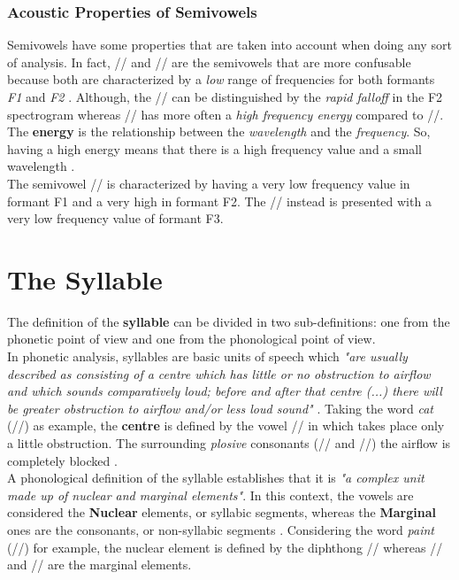 
\subsubsection{Acoustic Properties of Semivowels}
\label{ssub:Acousitc Properties of Semivowels}
Semivowels have some properties that are taken into account when doing any sort of analysis. In fact, // and // are the semivowels that are more confusable because both are characterized by a \textit{low} range of frequencies for both formants \textit{F1} and \textit{F2} \cite{jamesglassvictorzue2003}\cite{olive1993acoustics}. Although, the // can be distinguished by the \textit{rapid falloff} in the F2 spectrogram whereas // has more often a \textit{high frequency energy} compared to //. The \textbf{energy} is the relationship between the \textit{wavelength} and the \textit{frequency}. So, having a high energy means that there is a high frequency value and a small wavelength \cite{energy_relationship}. \\
\noindent The semivowel // is characterized by having a very low frequency value in formant F1 and a very high in formant F2. The // instead is presented with a very low frequency value of formant F3.


\section{The Syllable}
\label{sec:The syllable}
The definition of the \textbf{syllable} can be divided in two sub-definitions: one from the phonetic point of view and one from the phonological point of view. \\
\noindent In phonetic analysis, syllables are basic units of speech  which \textit{"are usually described as consisting of a centre which has little or no obstruction to airflow and which sounds comparatively loud; before and after that centre (...) there will be greater obstruction to airflow and/or less loud sound"} \cite{roach2000phonology}. Taking the word \textit{cat} (//) as example, the \textbf{centre} is defined by the vowel /\textipa{\ae}/ in which takes place only a little obstruction. The surrounding \textit{plosive} consonants (// and //) the airflow is completely blocked \cite{syllable_site}. \\
\noindent A phonological definition of the syllable establishes that it is \textit{"a complex unit made up of nuclear and marginal elements"}\cite{laver1994principles}. In this context, the vowels are considered the \textbf{Nuclear} elements, or syllabic segments, whereas the \textbf{Marginal} ones are the consonants, or non-syllabic segments \cite{syllable_site}. Considering the word \textit{paint} (//) for example, the nuclear element is defined by the diphthong // whereas // and // are the marginal elements.


